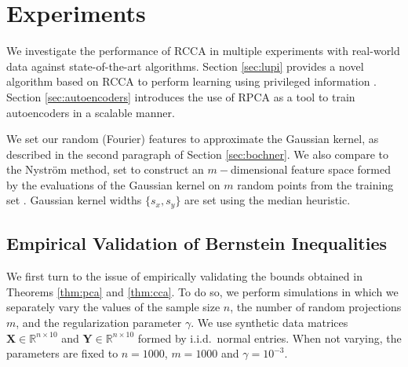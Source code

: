 \documentclass{article}
\begin{document}
  \section{Experiments} \label{sec:experiments}
  We investigate the performance of RCCA in multiple experiments with
  real-world data against state-of-the-art algorithms. Section \ref{sec:lupi}
  provides a novel algorithm based on RCCA to perform learning using privileged
  information \citep{Vapnik09}. Section \ref{sec:autoencoders} introduces the
  use of RPCA as a tool to train autoencoders in a scalable manner.

  We set our random (Fourier) features to approximate the Gaussian kernel, as
  described in the second paragraph of Section \ref{sec:bochner}. We also
  compare to the Nystr\"om method, set to construct an $m-$dimensional feature
  space formed by the evaluations of the Gaussian kernel on $m$ random points
  from the training set \citep{Yang12}. Gaussian kernel widths $\lbrace
  s_x,s_y\rbrace$ are set using the median heuristic.
 
  \subsection{Empirical Validation of Bernstein
  Inequalities}\label{sec:expbounds} We first turn to the issue of empirically
  validating the bounds obtained in Theorems \ref{thm:pca} and \ref{thm:cca}.
  To do so, we perform simulations in which we separately vary the values of
  the sample size $n$, the number of random projections $m$, and the
  regularization parameter $\gamma$. We use synthetic data matrices $\bm {X}\in
  \mathbb{R}^{n\times 10}$ and $\bm {Y}\in \mathbb{R}^{n\times 10}$ formed by
  i.i.d.\ normal entries. When not varying, the parameters are fixed to
  $n=1000$, $m=1000$ and $\gamma = 10^{-3}$.
\end{document}
